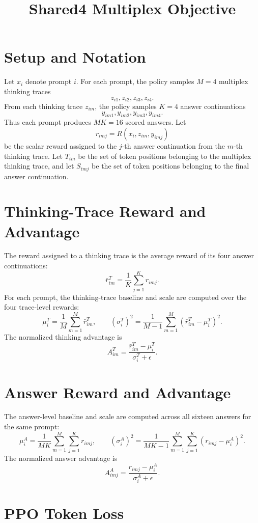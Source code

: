 \documentclass[11pt]{article}
\title{Shared4 Multiplex Objective}
\author{}
\date{}
\begin{document}
\maketitle

\section{Setup and Notation}

Let \(x_i\) denote prompt \(i\). For each prompt, the policy samples
\(M=4\) multiplex thinking traces
\[
  z_{i1}, z_{i2}, z_{i3}, z_{i4}.
\]
From each thinking trace \(z_{im}\), the policy samples \(K=4\) answer
continuations
\[
  y_{im1}, y_{im2}, y_{im3}, y_{im4}.
\]
Thus each prompt produces \(MK=16\) scored answers. Let
\[
  r_{imj} = R(x_i, z_{im}, y_{imj})
\]
be the scalar reward assigned to the \(j\)-th answer continuation from the
\(m\)-th thinking trace. Let \(T_{im}\) be the set of token positions belonging
to the multiplex thinking trace, and let \(S_{imj}\) be the set of token
positions belonging to the final answer continuation.

\section{Thinking-Trace Reward and Advantage}

The reward assigned to a thinking trace is the average reward of its four
answer continuations:
\[
  \bar r^T_{im}
  =
  \frac{1}{K}\sum_{j=1}^{K} r_{imj}.
\]
For each prompt, the thinking-trace baseline and scale are computed over the
four trace-level rewards:
\[
  \mu_i^T = \frac{1}{M}\sum_{m=1}^{M} \bar r^T_{im},
  \qquad
  (\sigma_i^T)^2
  =
  \frac{1}{M-1}\sum_{m=1}^{M}(\bar r^T_{im}-\mu_i^T)^2.
\]
The normalized thinking advantage is
\[
  A^T_{im}
  =
  \frac{\bar r^T_{im}-\mu_i^T}{\sigma_i^T+\epsilon}.
\]

\section{Answer Reward and Advantage}

The answer-level baseline and scale are computed across all sixteen answers for
the same prompt:
\[
  \mu_i^A = \frac{1}{MK}\sum_{m=1}^{M}\sum_{j=1}^{K} r_{imj},
  \qquad
  (\sigma_i^A)^2
  =
  \frac{1}{MK-1}
  \sum_{m=1}^{M}\sum_{j=1}^{K}(r_{imj}-\mu_i^A)^2.
\]
The normalized answer advantage is
\[
  A^A_{imj}
  =
  \frac{r_{imj}-\mu_i^A}{\sigma_i^A+\epsilon}.
\]

\section{PPO Token Loss}
\end{document}
